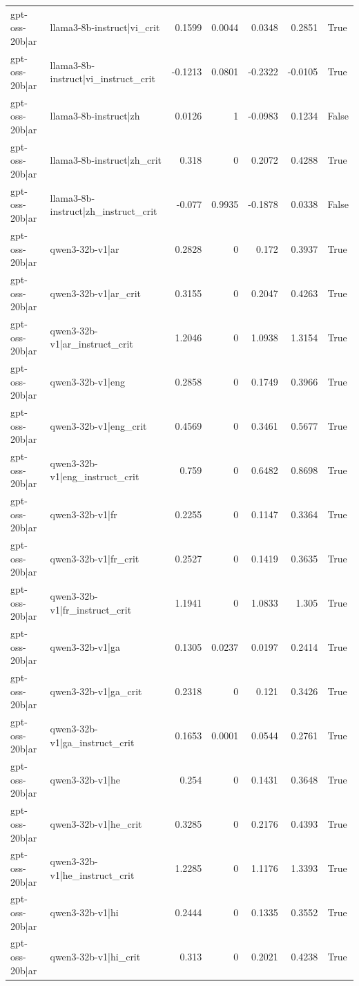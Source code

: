 \begin{table}
\begin{tabular}{l l r r r r l}
gpt-oss-20b|ar & llama3-8b-instruct|vi_crit & 0.1599 & 0.0044 & 0.0348 & 0.2851 & True \\
gpt-oss-20b|ar & llama3-8b-instruct|vi_instruct_crit & -0.1213 & 0.0801 & -0.2322 & -0.0105 & True \\
gpt-oss-20b|ar & llama3-8b-instruct|zh & 0.0126 & 1 & -0.0983 & 0.1234 & False \\
gpt-oss-20b|ar & llama3-8b-instruct|zh_crit & 0.318 & 0 & 0.2072 & 0.4288 & True \\
gpt-oss-20b|ar & llama3-8b-instruct|zh_instruct_crit & -0.077 & 0.9935 & -0.1878 & 0.0338 & False \\
gpt-oss-20b|ar & qwen3-32b-v1|ar & 0.2828 & 0 & 0.172 & 0.3937 & True \\
gpt-oss-20b|ar & qwen3-32b-v1|ar_crit & 0.3155 & 0 & 0.2047 & 0.4263 & True \\
gpt-oss-20b|ar & qwen3-32b-v1|ar_instruct_crit & 1.2046 & 0 & 1.0938 & 1.3154 & True \\
gpt-oss-20b|ar & qwen3-32b-v1|eng & 0.2858 & 0 & 0.1749 & 0.3966 & True \\
gpt-oss-20b|ar & qwen3-32b-v1|eng_crit & 0.4569 & 0 & 0.3461 & 0.5677 & True \\
gpt-oss-20b|ar & qwen3-32b-v1|eng_instruct_crit & 0.759 & 0 & 0.6482 & 0.8698 & True \\
gpt-oss-20b|ar & qwen3-32b-v1|fr & 0.2255 & 0 & 0.1147 & 0.3364 & True \\
gpt-oss-20b|ar & qwen3-32b-v1|fr_crit & 0.2527 & 0 & 0.1419 & 0.3635 & True \\
gpt-oss-20b|ar & qwen3-32b-v1|fr_instruct_crit & 1.1941 & 0 & 1.0833 & 1.305 & True \\
gpt-oss-20b|ar & qwen3-32b-v1|ga & 0.1305 & 0.0237 & 0.0197 & 0.2414 & True \\
gpt-oss-20b|ar & qwen3-32b-v1|ga_crit & 0.2318 & 0 & 0.121 & 0.3426 & True \\
gpt-oss-20b|ar & qwen3-32b-v1|ga_instruct_crit & 0.1653 & 0.0001 & 0.0544 & 0.2761 & True \\
gpt-oss-20b|ar & qwen3-32b-v1|he & 0.254 & 0 & 0.1431 & 0.3648 & True \\
gpt-oss-20b|ar & qwen3-32b-v1|he_crit & 0.3285 & 0 & 0.2176 & 0.4393 & True \\
gpt-oss-20b|ar & qwen3-32b-v1|he_instruct_crit & 1.2285 & 0 & 1.1176 & 1.3393 & True \\
gpt-oss-20b|ar & qwen3-32b-v1|hi & 0.2444 & 0 & 0.1335 & 0.3552 & True \\
gpt-oss-20b|ar & qwen3-32b-v1|hi_crit & 0.313 & 0 & 0.2021 & 0.4238 & True \\

\end{tabular}
\end{table}

